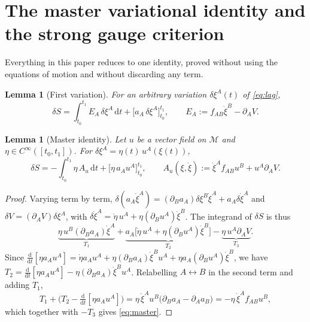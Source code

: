 \documentclass[12pt]{article}
\theoremstyle{plain}
\newtheorem{lemma}[theorem]{Lemma}
\theoremstyle{definition}
\theoremstyle{remark}
\newcommand{\dd}{\mathrm{d}}
\newcommand{\pd}[1]{\partial_{#1}}
\newcommand{\Mm}{\mathcal{M}}
\begin{document}
	\section{The master variational identity and the strong gauge criterion}
	\label{sec:strong}
	
	Everything in this paper reduces to one identity, proved without using the
	equations of motion and without discarding any term.
	
	\begin{lemma}[First variation]
		\label{lem:firstvar}
		For an arbitrary variation $\delta\xi^{A}(t)$ of \eqref{eq:lag},
		\begin{equation}
			\delta S=\int_{t_{0}}^{t_{1}}E_{A}\,\delta\xi^{A}\,\dd t
			+\bigl[a_{A}\,\delta\xi^{A}\bigr]_{t_{0}}^{t_{1}},
			\qquad
			E_{A}:=f_{AB}\dot\xi^{B}-\pd{A}V .
			\label{eq:firstvar}
		\end{equation}
	\end{lemma}
	
	\begin{lemma}[Master identity]
		\label{lem:master}
		Let $u$ be a vector field on $\Mm$ and $\eta\in C^{\infty}([t_{0},t_{1}])$. For
		$\delta\xi^{A}=\eta(t)\,u^{A}(\xi(t))$,
		\begin{equation}
			\delta S=-\int_{t_{0}}^{t_{1}}\eta\,A_{u}\,\dd t
			+\bigl[\eta\,a_{A}u^{A}\bigr]_{t_{0}}^{t_{1}},
			\qquad
			A_{u}(\xi,\dot\xi):=\dot\xi^{A}f_{AB}u^{B}+u^{A}\pd{A}V .
			\label{eq:master}
		\end{equation}
	\end{lemma}
	
	\begin{proof}
		Varying term by term,
		$\delta(a_{A}\dot\xi^{A})=(\pd{B}a_{A})\delta\xi^{B}\dot\xi^{A}
		+a_{A}\delta\dot\xi^{A}$ and $\delta V=(\pd{A}V)\delta\xi^{A}$, with
		$\delta\dot\xi^{A}=\dot\eta\,u^{A}+\eta(\pd{B}u^{A})\dot\xi^{B}$. The integrand
		of $\delta S$ is thus
		\[
		\underbrace{\eta\,u^{B}(\pd{B}a_{A})\dot\xi^{A}}_{T_{1}}
		+\underbrace{a_{A}\bigl[\dot\eta\,u^{A}
			+\eta(\pd{B}u^{A})\dot\xi^{B}\bigr]}_{T_{2}}
		-\underbrace{\eta\,u^{A}\pd{A}V}_{T_{3}} .
		\]
		Since
		$\tfrac{\dd}{\dd t}[\eta a_{A}u^{A}]
		=\dot\eta a_{A}u^{A}+\eta(\pd{B}a_{A})\dot\xi^{B}u^{A}
		+\eta a_{A}(\pd{B}u^{A})\dot\xi^{B}$, we have
		$T_{2}=\tfrac{\dd}{\dd t}[\eta a_{A}u^{A}]-\eta(\pd{B}a_{A})\dot\xi^{B}u^{A}$.
		Relabelling $A\leftrightarrow B$ in the second term and adding $T_{1}$,
		\[
		T_{1}+\bigl(T_{2}-\tfrac{\dd}{\dd t}[\eta a_{A}u^{A}]\bigr)
		=\eta\,\dot\xi^{A}u^{B}\bigl(\pd{B}a_{A}-\pd{A}a_{B}\bigr)
		=-\eta\,\dot\xi^{A}f_{AB}u^{B},
		\]
		which together with $-T_{3}$ gives \eqref{eq:master}.
	\end{proof}
	
\end{document}
